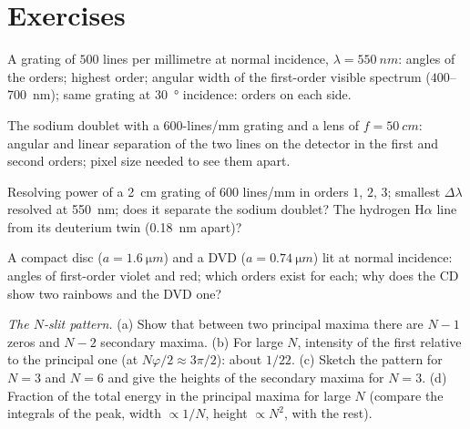 \section{Exercises}

\begin{exercise}[$\star$]\label{exo:b2:gratings:1}
A grating of $500$ lines per millimetre at normal incidence, $\lambda =
\qty{550}{nm}$: angles of the orders; highest order; angular width of the
first-order visible spectrum ($400$--\qty{700}{nm}); same grating at
\qty{30}{\degree} incidence: orders on each side.
\end{exercise}

\begin{exercise}[$\star$]\label{exo:b2:gratings:2}
The sodium doublet with a $600$-lines/mm grating and a lens of $f =
\qty{50}{cm}$: angular and linear separation of the two lines on the
detector in the first and second orders; pixel size needed to see
them apart.
\end{exercise}

\begin{exercise}[$\star$]\label{exo:b2:gratings:3}
Resolving power of a \qty{2}{cm} grating of $600$ lines/mm in orders $1$, $2$,
$3$; smallest $\Delta\lambda$ resolved at \qty{550}{nm}; does it separate the sodium
doublet? The hydrogen H$\alpha$ line from its deuterium twin (\qty{0.18}{nm}
apart)?
\end{exercise}

\begin{exercise}[$\star$]\label{exo:b2:gratings:4}
A compact disc ($a = \qty{1.6}{\micro m}$) and a DVD ($a = \qty{0.74}{\micro m}$) lit at
normal incidence: angles of first-order violet and red; which orders
exist for each; why does the CD show two rainbows and the DVD one?
\end{exercise}

\begin{exercise}[$\star\star$]\label{exo:b2:gratings:5}
\emph{The $N$-slit pattern.} (a) Show that between two principal maxima
there are $N - 1$ zeros and $N - 2$ secondary maxima. (b) For large $N$,
intensity of the first  relative to the principal
one (at $N\varphi/2 \approx 3\pi/2$): about $1/22$. (c) Sketch the pattern for
$N = 3$ and $N = 6$ and give the heights of the secondary maxima for
$N = 3$. (d) Fraction of the total energy in the principal maxima for
large $N$ (compare the integrals of the peak, width $\propto 1/N$, height
$\propto N^2$, with the rest).
\end{exercise}

